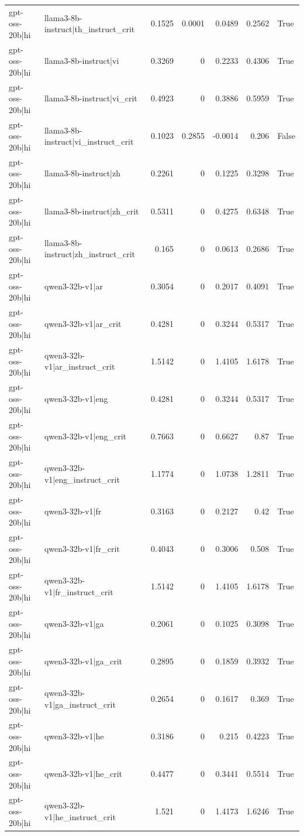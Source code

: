 \begin{table}
\begin{tabular}{l l r r r r l}
gpt-oss-20b|hi & llama3-8b-instruct|th_instruct_crit & 0.1525 & 0.0001 & 0.0489 & 0.2562 & True \\
gpt-oss-20b|hi & llama3-8b-instruct|vi & 0.3269 & 0 & 0.2233 & 0.4306 & True \\
gpt-oss-20b|hi & llama3-8b-instruct|vi_crit & 0.4923 & 0 & 0.3886 & 0.5959 & True \\
gpt-oss-20b|hi & llama3-8b-instruct|vi_instruct_crit & 0.1023 & 0.2855 & -0.0014 & 0.206 & False \\
gpt-oss-20b|hi & llama3-8b-instruct|zh & 0.2261 & 0 & 0.1225 & 0.3298 & True \\
gpt-oss-20b|hi & llama3-8b-instruct|zh_crit & 0.5311 & 0 & 0.4275 & 0.6348 & True \\
gpt-oss-20b|hi & llama3-8b-instruct|zh_instruct_crit & 0.165 & 0 & 0.0613 & 0.2686 & True \\
gpt-oss-20b|hi & qwen3-32b-v1|ar & 0.3054 & 0 & 0.2017 & 0.4091 & True \\
gpt-oss-20b|hi & qwen3-32b-v1|ar_crit & 0.4281 & 0 & 0.3244 & 0.5317 & True \\
gpt-oss-20b|hi & qwen3-32b-v1|ar_instruct_crit & 1.5142 & 0 & 1.4105 & 1.6178 & True \\
gpt-oss-20b|hi & qwen3-32b-v1|eng & 0.4281 & 0 & 0.3244 & 0.5317 & True \\
gpt-oss-20b|hi & qwen3-32b-v1|eng_crit & 0.7663 & 0 & 0.6627 & 0.87 & True \\
gpt-oss-20b|hi & qwen3-32b-v1|eng_instruct_crit & 1.1774 & 0 & 1.0738 & 1.2811 & True \\
gpt-oss-20b|hi & qwen3-32b-v1|fr & 0.3163 & 0 & 0.2127 & 0.42 & True \\
gpt-oss-20b|hi & qwen3-32b-v1|fr_crit & 0.4043 & 0 & 0.3006 & 0.508 & True \\
gpt-oss-20b|hi & qwen3-32b-v1|fr_instruct_crit & 1.5142 & 0 & 1.4105 & 1.6178 & True \\
gpt-oss-20b|hi & qwen3-32b-v1|ga & 0.2061 & 0 & 0.1025 & 0.3098 & True \\
gpt-oss-20b|hi & qwen3-32b-v1|ga_crit & 0.2895 & 0 & 0.1859 & 0.3932 & True \\
gpt-oss-20b|hi & qwen3-32b-v1|ga_instruct_crit & 0.2654 & 0 & 0.1617 & 0.369 & True \\
gpt-oss-20b|hi & qwen3-32b-v1|he & 0.3186 & 0 & 0.215 & 0.4223 & True \\
gpt-oss-20b|hi & qwen3-32b-v1|he_crit & 0.4477 & 0 & 0.3441 & 0.5514 & True \\
gpt-oss-20b|hi & qwen3-32b-v1|he_instruct_crit & 1.521 & 0 & 1.4173 & 1.6246 & True \\

\end{tabular}
\end{table}
